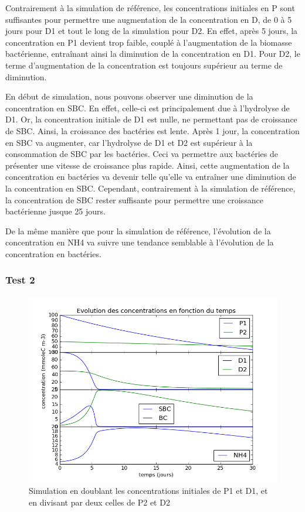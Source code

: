 \par{
Contrairement \`a la simulation de r\'ef\'erence, les concentrations initiales en P sont suffisantes pour permettre une augmentation de la concentration en D, de 0 \`a 5 jours pour D1 et tout le long de la simulation pour D2. En effet, apr\`es 5 jours, la concentration en P1 devient trop faible, coupl\'e \`a l'augmentation de la biomasse bact\'erienne, entra\^inant ainsi la diminution de la concentration en D1. Pour D2, le terme d'augmentation de la concentration est toujours sup\'erieur au terme de diminution.
}
\par{
En d\'ebut de simulation, nous pouvons observer une diminution de la concentration en SBC. En effet, celle-ci est principalement due \`a l'hydrolyse de D1. Or, la concentration initiale de D1 est nulle, ne permettant pas de croissance de SBC. Ainsi, la croissance des bact\'eries est lente. Apr\`es 1 jour, la concentration en SBC va augmenter, car l'hydrolyse de D1 et D2 est sup\'erieur \`a la consommation de SBC par les bact\'eries. Ceci va permettre aux bact\'eries de pr\'esenter une vitesse de croissance plus rapide. Ainsi, cette augmentation de la concentration en bact\'eries va devenir telle qu'elle va entra\^iner une diminution de la concentration en SBC. Cependant, contrairement \`a la simulation de r\'ef\'erence, la concentration de SBC rester suffisante pour permettre une croissance bact\'erienne jusque 25 jours.
}
\par{
De la m\^eme mani\`ere que pour la simulation de r\'ef\'erence, l'\'evolution de la concentration en NH4 va suivre une tendance semblable \`a l'\'evolution de la concentration en bact\'eries.
}

\subsubsection{Test 2}

\begin{figure}[h!]
  \includegraphics[width=\textwidth]{partie2/Test2.png}
  \caption{Simulation en doublant les concentrations initiales de P1 et D1, et en divisant par deux celles de P2 et D2
  }
  \label{fig:partie2test2}
\end{figure}

